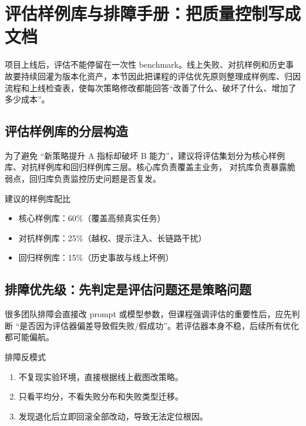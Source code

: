 \section{评估样例库与排障手册：把质量控制写成文档}

项目上线后，评估不能停留在一次性 benchmark。线上失败、对抗样例和历史事故要持续回灌为版本化资产，本节因此把课程的评估优先原则整理成样例库、归因流程和上线检查表，使每次策略修改都能回答“改善了什么、破坏了什么、增加了多少成本”。

\subsection{评估样例库的分层构造}
为了避免 ``新策略提升 A 指标却破坏 B 能力''，建议将评估集划分为核心样例库、对抗样例库和回归样例库三层。核心库负责覆盖主业务， 对抗库负责暴露脆弱点，回归库负责监控历史问题是否复发。

\begin{knowledgebox}{建议的样例库配比}
\begin{itemize}
    \item 核心样例库：60\%（覆盖高频真实任务）
    \item 对抗样例库：25\%（越权、提示注入、长链路干扰）
    \item 回归样例库：15\%（历史事故与线上坏例）
\end{itemize}
\end{knowledgebox}

\subsection{排障优先级：先判定是评估问题还是策略问题}
很多团队排障会直接改 prompt 或模型参数，但课程强调评估的重要性后，应先判断 ``是否因为评估器偏差导致假失败/假成功''。若评估器本身不稳，后续所有优化都可能偏航。

\begin{warningbox}{排障反模式}
\begin{enumerate}
    \item 不复现实验环境，直接根据线上截图改策略。
    \item 只看平均分，不看失败分布和失败类型迁移。
    \item 发现退化后立即回滚全部改动，导致无法定位根因。
\end{enumerate}
\end{warningbox}

